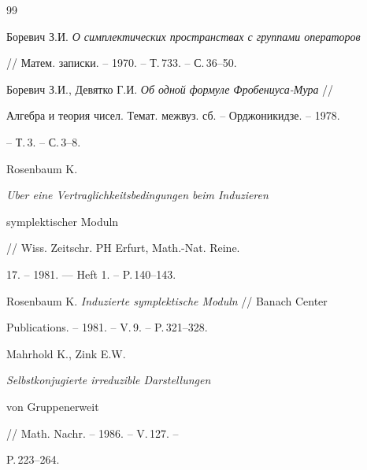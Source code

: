 \begin{thebibliography}{99}







Боревич З.И. {\em О симплектических пространствах с группами операторов}


// Матем. записки. -- 1970. -- Т.\,733. -- С.\,36--50.




Боревич З.И., Девятко Г.И. {\em Об одной формуле Фробениуса-Мура} //


Алгебра и теория чисел. Темат. межвуз. сб. -- Орджоникидзе. -- 1978.


-- Т.\,3. -- С.\,3--8.




Rosenbaum K. {\em Uber eine Vertraglichkeitsbedingungen beim Induzieren


symplektischer Moduln} // Wiss. Zeitschr. PH Erfurt, Math.-Nat. Reine.


17. -- 1981. --- Heft 1. -- P.\,140--143.




Rosenbaum K. {\em Induzierte symplektische Moduln} // Banach Center


Publications. -- 1981. -- V.\,9. -- P.\,321--328.




Mahrhold K., Zink E.W. {\em Selbstkonjugierte irreduzible Darstellungen


von Gruppenerweit} // Math. Nachr. -- 1986. -- V.\,127. --


P.\,223--264.





\end{thebibliography}





\vskip 2cm









\label{end}





